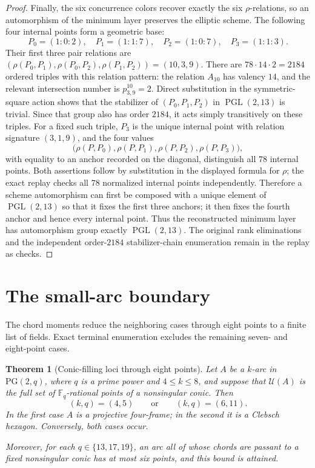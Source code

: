 \documentclass[11pt]{article}
\newtheorem{theorem}{Theorem}[section]
\theoremstyle{remark}
\newcommand{\PG}{\mathrm{PG}}
\newcommand{\F}{\mathbb{F}}
\newcommand{\cU}{\mathcal{U}}
\begin{document}
\begin{proof}
Finally, the six concurrence colors recover exactly the six $\rho$-relations,
so an automorphism of the minimum layer preserves the elliptic scheme.  The
following four internal points form a geometric base:
\[
 P_0=(1:0:2),\quad P_1=(1:1:7),\quad
 P_2=(1:0:7),\quad P_3=(1:1:3).
\]
Their first three pair relations are
$(\rho(P_0,P_1),\rho(P_0,P_2),\rho(P_1,P_2))=(10,3,9)$.
There are $78\cdot14\cdot2=2184$ ordered triples with this relation pattern:
the relation $A_{10}$ has valency $14$, and the relevant intersection number
is $p_{3,9}^{10}=2$.  Direct substitution in the symmetric-square action
shows that the stabilizer of $(P_0,P_1,P_2)$ in
$\operatorname{PGL}(2,13)$ is trivial.  Since that group also has order
$2184$, it acts simply transitively on these triples.  For a fixed such
triple, $P_3$ is the unique internal point with relation signature
$(3,1,9)$, and the four values
\[
 \bigl(\rho(P,P_0),\rho(P,P_1),\rho(P,P_2),\rho(P,P_3)\bigr),
\]
with equality to an anchor recorded on the diagonal, distinguish all $78$
internal points.  Both assertions follow by substitution in the displayed
formula for $\rho$; the exact replay checks all $78$ normalized internal
points independently.  Therefore a scheme automorphism can first be composed
with a unique element of $\operatorname{PGL}(2,13)$ so that it fixes the first
three anchors; it then fixes the fourth anchor and hence every internal point.
Thus the reconstructed minimum layer has automorphism group exactly
$\operatorname{PGL}(2,13)$.  The original rank eliminations and the independent
order-$2184$ stabilizer-chain enumeration remain in the replay as checks.
\end{proof}

\section{The small-arc boundary}
\label{sec:small-arc}

The chord moments reduce the neighboring cases through eight points to a
finite list of fields. Exact terminal enumeration excludes the remaining
seven- and eight-point cases.

\begin{theorem}[Conic-filling loci through eight points]
\label{thm:small-k-conic-filling}
Let $A$ be a $k$-arc in $\PG(2,q)$, where $q$ is a prime power and
$4\le k\le8$, and suppose that $\cU(A)$ is the full set of
$\F_q$-rational points of a nonsingular conic. Then
\[
 (k,q)=(4,5)\qquad\text{or}\qquad(k,q)=(6,11).
\]
In the first case $A$ is a projective four-frame; in the second it is a
Clebsch hexagon. Conversely, both cases occur.

Moreover, for each $q\in\{13,17,19\}$, an arc all of whose chords are
passant to a fixed nonsingular conic has at most six points, and this bound
is attained.
\end{theorem}
\end{document}
